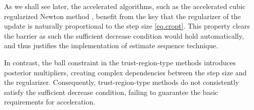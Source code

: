 \documentclass{article}
\theoremstyle{plain}
\theoremstyle{definition}
\theoremstyle{remark}
\newcommand{\cz}[1]{{\color{rr} #1}}
\begin{document}





As we shall see later, the accelerated algorithms, such as the accelerated cubic regularized Newton method \cite{nesterov2008accelerating}, benefit from the key that the regularizer of the update is naturally proportional to the step size \eqref{eq.cropt}. This property clears the barrier as such the sufficient decrease condition would hold automatically, and thus justifies the implementation of estimate sequence technique.

In contrast, the ball constraint in the trust-region-type methods introduces posterior multipliers, creating complex dependencies between the step size and the regularizer\cite{nocedal1999numerical,cartis2022evaluation}. Consequently, trust-region-type methods do not consistently satisfy the sufficient decrease condition, failing to guarantee the basic requirements for acceleration.
\end{document}
